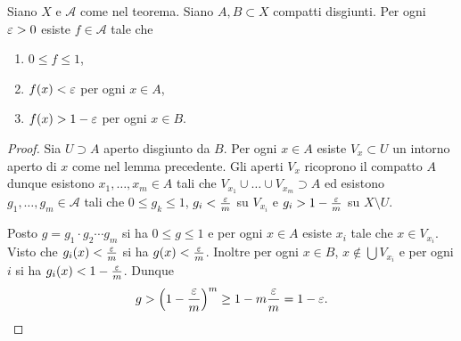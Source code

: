 \begin{lemma}
Siano $X$ e ${\mathcal A}$ come nel teorema.
Siano $A,B\subset X$ compatti disgiunti.
Per ogni $\varepsilon>0$ esiste $f\in {\mathcal A}$ tale che 
\begin{enumerate}
\item    $0 \le f \le 1$,
\item    $f(x) < \varepsilon$ per ogni  $x\in A$,
\item    $f(x) > 1-\varepsilon$ per ogni $x \in B$.
\end{enumerate}
\end{lemma}
%
\begin{proof}
Sia $U\supset A$ aperto disgiunto da $B$.
Per ogni $x\in A$ esiste $V_x\subset U$ 
un intorno aperto di $x$ come nel lemma precedente.
Gli aperti $V_x$ ricoprono il compatto $A$ 
dunque esistono $x_1, \dots, x_m\in A$ tali che 
$V_{x_1} \cup \dots \cup V_{x_m} \supset A$
ed esistono $g_1, \dots, g_m \in {\mathcal A}$ 
tali che $0\le g_k \le 1$, $g_i < \frac {\varepsilon} m$ su $V_{x_i}$
e $g_i > 1 - \frac {\varepsilon} m$ su $X\setminus U$.

Posto $g= g_1 \cdot g_2 \cdots g_m$ 
si ha $0\le g \le 1$ e per ogni $x\in A$ 
esiste $x_i$ tale che $x\in V_{x_i}$.
Visto che $g_i(x) < \frac {\varepsilon} m$ si ha 
$g(x) < \frac {\varepsilon} m$.
Inoltre per ogni $x\in B$, $x \not \in \bigcup V_{x_i}$
e per ogni $i$ si ha $g_i(x) < 1 - \frac {\varepsilon} m$.
Dunque 
\[
g > {\left( 1-\frac{\varepsilon} m \right)}^m \ge 1 - m \frac {\varepsilon} m = 1-\varepsilon.
\]
\end{proof}

